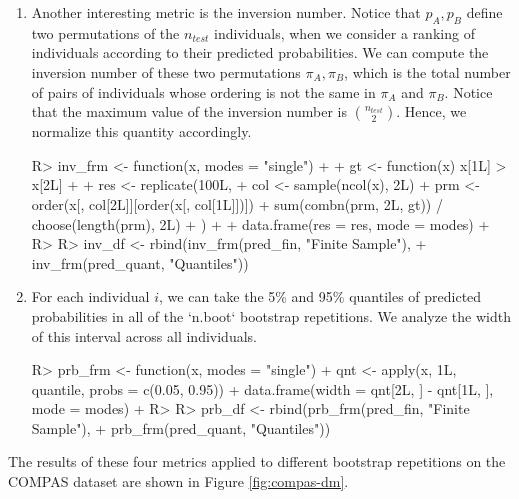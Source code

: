 \documentclass[
  nojss]{jss}
\begin{document}
\begin{enumerate}
\item Another interesting metric is the inversion number. Notice that $p_A, p_B$ define two permutations of the $n_{test}$ individuals, when we consider a ranking of individuals according to their predicted probabilities. We can compute the inversion number of these two permutations $\pi_A, \pi_B$, which is the total number of pairs of individuals whose ordering is not the same in $\pi_A$ and $\pi_B$. Notice that the maximum value of the inversion number is $\binom{n_{test}}{2}$. Hence, we normalize this quantity accordingly.

\begin{CodeChunk}
\begin{CodeInput}
R> inv_frm <- function(x, modes = "single") {
+ 
+   gt <- function(x) x[1L] > x[2L]
+ 
+   res <- replicate(100L, {
+     col <- sample(ncol(x), 2L)
+     prm <- order(x[, col[2L]][order(x[, col[1L]])])
+     sum(combn(prm, 2L, gt)) / choose(length(prm), 2L)
+   })
+ 
+   data.frame(res = res, mode = modes)
+ }
R> 
R> inv_df <- rbind(inv_frm(pred_fin, "Finite Sample"),
+                 inv_frm(pred_quant, "Quantiles"))
\end{CodeInput}
\end{CodeChunk}

\item For each individual $i$, we can take the 5\% and 95\% quantiles of predicted probabilities in all of the `n.boot` bootstrap repetitions. We analyze the width of this interval across all individuals.

\begin{CodeChunk}
\begin{CodeInput}
R> prb_frm <- function(x, modes = "single") {
+   qnt <- apply(x, 1L, quantile, probs = c(0.05, 0.95))
+   data.frame(width = qnt[2L, ] - qnt[1L, ], mode = modes)
+ }
R> 
R> prb_df <- rbind(prb_frm(pred_fin, "Finite Sample"),
+                 prb_frm(pred_quant, "Quantiles"))
\end{CodeInput}
\end{CodeChunk}

\end{enumerate}

The results of these four metrics applied to different bootstrap
repetitions on the COMPAS dataset are shown in Figure
\ref{fig:compas-dm}.
\end{document}
